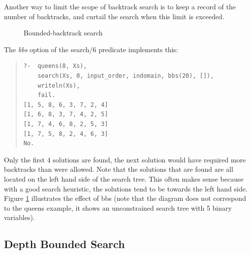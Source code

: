 Another way to limit the scope of backtrack search is to keep a
record of the number of backtracks, and curtail the search when this
limit is exceeded.
\begin{figure}
\begin{center}
\end{center}
\caption{Bounded-backtrack search}
\label{figbbs}
\end{figure}
The {\em bbs} option of the search/6 predicate implements this:
\begin{quote}\begin{verbatim}
?-  queens(8, Xs),
    search(Xs, 0, input_order, indomain, bbs(20), []),
    writeln(Xs),
    fail.
[1, 5, 8, 6, 3, 7, 2, 4]
[1, 6, 8, 3, 7, 4, 2, 5]
[1, 7, 4, 6, 8, 2, 5, 3]
[1, 7, 5, 8, 2, 4, 6, 3]
No.
\end{verbatim}\end{quote}
Only the first 4 solutions are found, the next solution would have
required more backtracks than were allowed. 
Note that the solutions that are found are all located on the left hand
side of the search tree. This often makes sense because with a good
search heuristic, the solutions tend to be towards the left hand side.
Figure \ref{figbbs} illustrates the effect of bbs (note that the diagram
does not correspond to the queens example, it shows an unconstrained search
tree with 5 binary variables).


\subsection{Depth Bounded Search}

